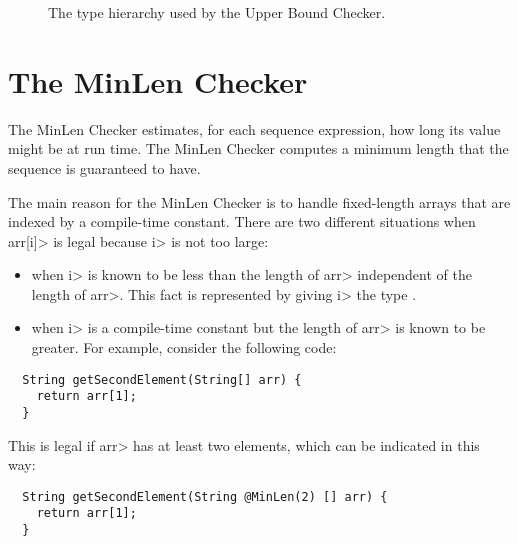 \begin{figure}
  \caption{The type hierarchy used by the Upper Bound Checker.}
  \label{fig-upperbound-types}
\end{figure}



\section{The MinLen Checker\label{index-minlen}}

The MinLen Checker estimates, for each sequence expression, how long its value
might be at run time.  The MinLen Checker computes a minimum length that
the sequence is guaranteed to have.

The main reason for the MinLen Checker is to handle fixed-length arrays
that are indexed by a compile-time constant.
There are two different situations when \<arr[i]> is legal because \<i> is
not too large:
\begin{itemize}
\item
  when \<i> is known to be less than the length of \<arr> independent of the length of
  \<arr>.  This fact is represented by giving \<i> the type .
\item
  when \<i> is a compile-time constant but the length of \<arr> is known to
  be greater.  For example, consider the following code:
\end{itemize}

\begin{Verbatim}
  String getSecondElement(String[] arr) {
    return arr[1];
  }
\end{Verbatim}
  This is legal if \<arr> has at least two elements, which can be indicated
  in this way:
\begin{Verbatim}
  String getSecondElement(String @MinLen(2) [] arr) {
    return arr[1];
  }
\end{Verbatim}

